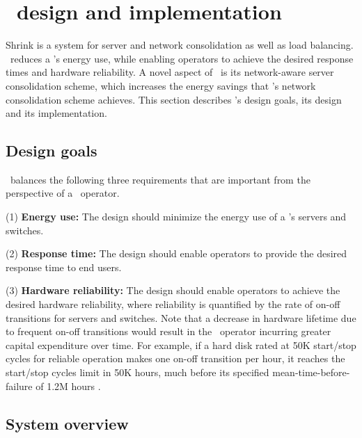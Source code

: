 

\section{\shrink\ design and implementation}
\label{sec:shrink-design}

Shrink is a system for server and network consolidation as well as load balancing. 
\shrink\ reduces a \cdc's energy use, while enabling operators to achieve the desired response times and hardware reliability.
A novel aspect of \shrink\ is its network-aware server consolidation scheme, which increases the energy savings that \shrink's network consolidation scheme achieves. This section describes \shrink's design goals, its design and its implementation.

\subsection{Design goals}
\shrink\  balances the following three requirements that are important from the perspective of a \cdc\ operator.

(1) \textbf{Energy use:} The design should minimize the energy use of a \cdc's servers and switches.

(2) \textbf{Response time:} The design should enable operators to provide the desired response time to end users. 

(3) \textbf{Hardware reliability:} The design should enable operators to achieve the desired hardware reliability, where reliability is quantified by the rate of on-off transitions for servers and switches. Note that a decrease in hardware lifetime due to frequent on-off transitions would result in the \cdc\ operator incurring greater capital expenditure over time. For example, if a hard disk rated at 50K start/stop cycles for reliable operation makes one on-off transition per hour, it reaches the start/stop cycles limit in 50K hours, much before its specified mean-time-before-failure of 1.2M hours \cite{seagate}.



\subsection{System overview}
\label{sec:overview}

